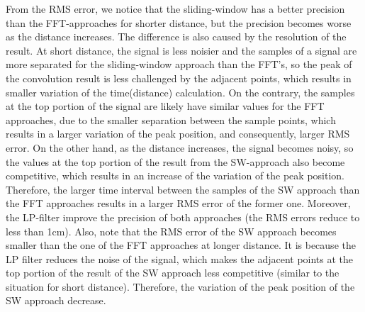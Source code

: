 From the RMS error, we notice that the sliding-window has a better precision than the FFT-approaches for shorter distance, but the precision becomes worse as the distance increases. The difference is also caused by the resolution of the result. At short distance, the signal is less noisier and the samples of a signal are more separated for the sliding-window approach than the FFT's, so the peak of the convolution result is less challenged by the adjacent points, which results in smaller variation of the time(distance) calculation. On the contrary, the samples at the top portion of the signal are likely have similar values for the FFT approaches, due to the smaller separation between the sample points, which results in a larger variation of the peak position, and consequently, larger RMS error. On the other hand, as the distance increases, the signal becomes noisy, so the values at the top portion of the result from the SW-approach also become competitive, which results in an increase of the variation of the peak position. Therefore, the larger time interval between the samples of the SW approach than the FFT approaches results in a larger RMS error of the former one. Moreover, the LP-filter improve the precision of both approaches (the RMS errors reduce to less than 1cm). Also, note that the RMS error of the SW approach becomes smaller than the one of the FFT approaches at longer distance. It is because the LP filter reduces the noise of the signal, which makes the adjacent points at the top portion of the result of the SW approach less competitive (similar to the situation for short distance). Therefore, the variation of the peak position of the SW approach decrease.



